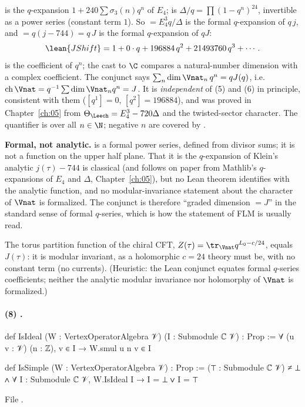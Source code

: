 \begin{dictionary}
 is the $q$-expansion $1+240\sum\sigma_3(n)q^n$ of $E_4$;  is $\Delta/q=\prod(1-q^n)^{24}$,
invertible as a power series (constant term $1$).  So  $=E_4^3q/\Delta$ is the formal
$q$-expansion of $q\,j$, and  $=q(j-744)=q\,J$ is the formal $q$-expansion of $qJ$:
\begin{equation*}
 \lean{JShift}=1+0\cdot q+196884\,q^2+21493760\,q^3+\cdots .
\end{equation*}
 is the coefficient of $q^n$; the cast to $\C$ compares a natural-number dimension with
a complex coefficient.  The conjunct says $\sum_n\dim\Vnat_n\,q^n=qJ(q)$, i.e.\ $\operatorname{ch}\Vnat=q^{-1}\sum\dim\Vnat_nq^n=J$.
It is \emph{independent} of (5) and (6) in principle, consistent with them ($[q^1]=0$, $[q^2]=196884$),
and was proved in Chapter~\ref{ch:05} from $\Theta_\Leech=E_4^3-720\Delta$ and the twisted-sector character.
The quantifier is over all $n\in\N$; negative $n$ are covered by .

\textbf{Formal, not analytic.}   is a formal power series, defined from divisor sums; it is
not a function on the upper half plane.  That it is the $q$-expansion of Klein's analytic
$j(\tau)-744$ is classical (and follows on paper from Mathlib's $q$-expansions of $E_4$ and $\Delta$,
Chapter~\ref{ch:05}), but no Lean theorem identifies  with the analytic function, and no
modular-invariance statement about the character of $\Vnat$ is formalized.  The conjunct is therefore
``graded dimension $=J$'' in the standard sense of formal $q$-series, which is how the statement of
FLM is usually read.
\end{dictionary}

\begin{physics}
The torus partition function of the chiral CFT, $Z(\tau)=\tr_{\Vnat}q^{L_0-c/24}$, equals $J(\tau)$: it is
modular invariant, as a holomorphic $c=24$ theory must be, with no constant term (no currents).
(Heuristic: the Lean conjunct equates formal $q$-series coefficients; neither the analytic modular
invariance nor holomorphy of $\Vnat$ is formalized.)
\end{physics}

\paragraph{(8) .}
\begin{leancode}
def IsIdeal (W : VertexOperatorAlgebra 𝒱) (I : Submodule ℂ 𝒱) : Prop :=
  ∀ (u v : 𝒱) (n : ℤ), v ∈ I → W.smul u n v ∈ I

def IsSimple (W : VertexOperatorAlgebra 𝒱) : Prop :=
  (⊤ : Submodule ℂ 𝒱) ≠ ⊥ ∧ ∀ I : Submodule ℂ 𝒱, W.IsIdeal I → I = ⊥ ∨ I = ⊤
\end{leancode}
File .

